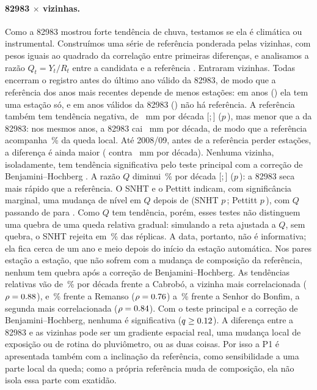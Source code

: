 \documentclass[11pt,a4paper]{article}
\newcommand{\IC}[2]{[#1;\,#2]}            %
\newcommand{\Est}{82983}
\begin{document}
\paragraph{\Est{} \texorpdfstring{$\times$}{x} vizinhas.}
Como a \Est{} mostrou forte tendência de chuva, testamos se ela é climática ou
instrumental. Construímos uma série de referência ponderada pelas vizinhas, com pesos iguais
ao quadrado da correlação entre primeiras diferenças, e analisamos a razão
$Q_t = Y_t/R_t$ entre a candidata e a referência \parencite{alexandersson1986,alexandersson1997}.
Entraram \NvizinhasUsadas{} vizinhas. Todas encerram o registro antes do último ano válido da \Est{},
de modo que a referência dos anos mais recentes depende de menos estações: em \NanosRefUmaViz{} anos
(\AnosRefUmaViz) ela tem uma estação só, e em \NanosSemRef{} anos válidos da \Est{} (\AnosSemRef) não
há referência. A referência também tem tendência negativa, de \SenReferencia{}~mm por década
\IC{\SenReferenciaICinf}{\SenReferenciaICsup} ($p$\,\PTesteReferencia), mas menor que a da \Est{}: nos
mesmos anos, a \Est{} cai \SenEstAnosRef{}~mm por década, de modo que a referência acompanha
\PctRefEst{}\,\% da queda local. Até 2008/09, antes de a referência perder estações, a diferença é
ainda maior (\SenRefAteOito{} contra \SenEstAteOito{}~mm por década). Nenhuma vizinha, isoladamente,
tem tendência significativa pelo teste principal com a correção de Benjamini--Hochberg
\parencite{benjamini1995}. A razão $Q$ diminui \SenQ{}\,\% por década \IC{\SenQICinf}{\SenQICsup}
($p$\,\PTesteQ): a \Est{} seca mais rápido que a referência. O SNHT e o Pettitt indicam, com
significância marginal, uma mudança de nível em $Q$ depois de \QuebraQ{} (SNHT $p$\,\PSnhtQ; Pettitt
$p$\,\PPettittQ), com $Q$ passando de \QAntes{} para \QDepois{}. Como $Q$ tem tendência, porém, esses
testes não distinguem uma quebra de uma queda relativa gradual: simulando a reta ajustada a $Q$, sem
quebra, o SNHT rejeita em \PctSnhtSobTendencia{}\,\% das réplicas. A data, portanto, não é informativa;
ela fica cerca de um ano e meio depois do início da estação automática. Nos \Npares{} pares estação a
estação, que não sofrem com a mudança de composição da referência, nenhum tem quebra após a correção
de Benjamini--Hochberg. As tendências relativas vão de \SenParCabrobo{}\,\% por década frente a
Cabrobó, a vizinha mais correlacionada ($\rho = \num{0.88}$), e \SenParRemanso{}\,\% frente a
Remanso ($\rho = \num{0.76}$) a \SenParBonfim{}\,\% frente a Senhor do Bonfim, a segunda mais
correlacionada ($\rho = \num{0.84}$). Com o teste principal e a correção de Benjamini--Hochberg,
nenhuma é significativa ($q \ge \num{0.12}$). A diferença entre a \Est{} e as vizinhas pode ser um
gradiente espacial real, uma mudança local de exposição ou de rotina do pluviômetro, ou as duas
coisas. Por isso a P1 é apresentada também com a inclinação da referência, como sensibilidade a uma
parte local da queda; como a própria referência muda de composição, ela não isola essa parte com
exatidão.
\end{document}
